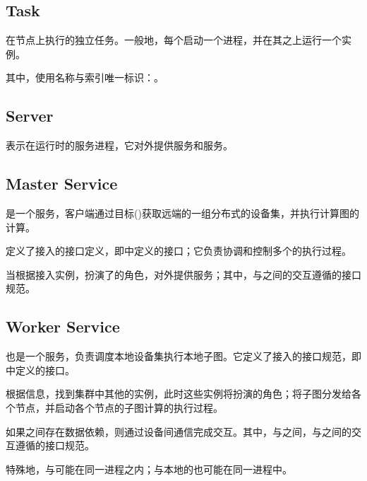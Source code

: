 \begin{content}
\subsection{Task}

在节点上执行的独立任务。一般地，每个启动一个进程，并在其之上运行一个实例。

其中，使用名称与索引唯一标识：。

\subsection{Server}

表示在运行时的服务进程，它对外提供服务和服务。

\subsection{Master Service}

是一个服务，客户端通过目标()获取远端的一组分布式的设备集，并执行计算图的计算。

定义了接入的接口定义，即中定义的接口；它负责协调和控制多个的执行过程。

当根据接入实例，扮演了的角色，对外提供服务；其中，与之间的交互遵循的接口规范。

\subsection{Worker Service}

也是一个服务，负责调度本地设备集执行本地子图。它定义了接入的接口规范，即中定义的接口。

根据信息，找到集群中其他的实例，此时这些实例将扮演的角色；将子图分发给各个节点，并启动各个节点的子图计算的执行过程。

如果之间存在数据依赖，则通过设备间通信完成交互。其中，与之间，与之间的交互遵循的接口规范。

特殊地，与可能在同一进程之内；与本地的也可能在同一进程中。

\end{content}

